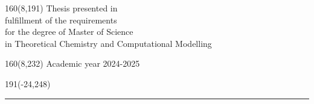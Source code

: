 \documentclass[12pt,a4paper,oneside]{book}
\begin{document}
%
\begin{textblock}{160}(8,191)
\textblockcolour{}
\vspace{-\parskip}
\flushright
Thesis presented in\\[4.5pt]
fulfillment of the requirements\\[4.5pt]
for the degree of Master of Science\\[4.5pt]
in Theoretical Chemistry and Computational Modelling\\
\end{textblock}
%
\begin{textblock}{160}(8,232)
\textblockcolour{}
\vspace{-\parskip}
\flushright
Academic year 2024-2025
\end{textblock}
%
\begin{textblock}{191}(-24,248)
{\color{blueline}\rule{550pt}{5.5pt}}
\end{textblock}
%

\setcounter{page}{0}
\onehalfspacing


\rmfamily




\sffamily
\tableofcontents
\rmfamily

\newpage
\setcounter{page}{0}







\printbibliography

%


\appendix

\end{document}
